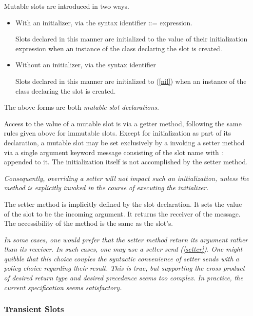 \documentclass{article}
\newcommand{\code}[1]{{\sf #1}}
\begin{document}
Mutable slots are introduced in two ways.
\begin{itemize}
\item
With an initializer,  via the syntax \code{identifier ::= expression.}
%

Slots declared in this manner are initialized to the value of their initialization expression when an instance of the class declaring the slot is created.
\item
Without an initializer, via the syntax \code{identifier}

Slots declared in this manner are initialized to \NIL{ } (\ref{nil}) when an instance of the class declaring the slot is created.
\end{itemize}

The above forms are both {\em mutable slot declarations.}

Access to the value of a mutable slot is via a getter method,  following the same rules given above for immutable slots.  Except for initialization as part of its declaration, a mutable slot may be set exclusively by a invoking a setter method via a single argument keyword message consisting of the slot name with : appended to it.   The initialization itself is not accomplished by the setter method.

{\it
Consequently, overriding a setter will not impact such an initialization, unless the method is explicitly invoked in the course of executing the initializer.
}

The setter method is implicitly defined by the slot declaration. It sets the value of the slot to be the incoming argument. It returns the receiver of the message. The accessibility of the method is the same as the slot's.



{\it 
In some cases, one would prefer that the setter method return its argument rather than its receiver.
In such cases, one may use a setter send (\ref{setter}). One might quibble that this choice couples the syntactic convenience of setter sends with a policy choice regarding their result. This is true, but supporting the cross product of desired return type and desired precedence seems too complex. In practice, the current specification seems satisfactory.
}

\subsubsection{Transient Slots}
\label{transientSlots}
\end{document}

